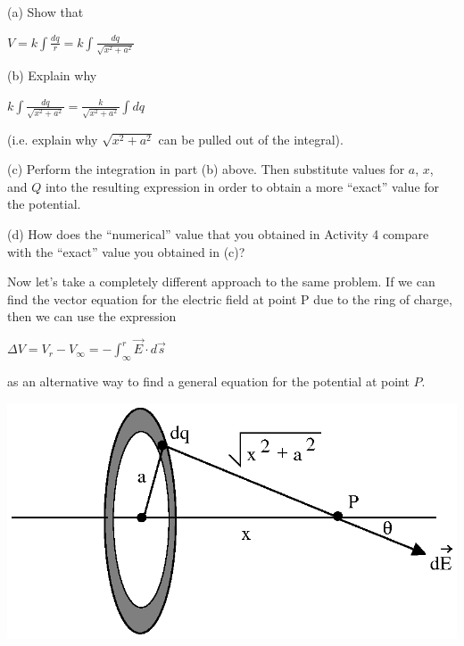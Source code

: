 (a) Show that

{\centering \( V=k\int \frac{dq}{r}=k\int \frac{dq}{\sqrt{x^{2}+a^{2}}} \)\par}
\vspace{25mm}

(b) Explain why

{\centering \( k\int \frac{dq}{\sqrt{x^{2}+a^{2}}}=\frac{k}{\sqrt{x^{2}+a^{2}}}\int dq \)\par}

(i.e. explain why \( \sqrt{x^{2}+a^{2}} \) can be pulled out of the integral).
\vspace{20mm}

(c) Perform the integration in part (b) above. Then substitute values
for $a$, $x$, and $Q$ into the resulting expression in order to obtain a
more {}``exact'' value for the potential.
\vspace{25mm}

(d) How does the {}``numerical'' value that you obtained in Activity
4 compare with the {}``exact'' value you obtained in (c)?
\vspace{20mm}

Now let's take a completely different approach to the same problem.
If we can find the vector equation for the electric field at point
P due to the ring of charge, then we can use the expression

{\centering \( \Delta V=V_{r}-V_{\infty }=-\int ^{r}_{\infty }\overrightarrow{E}\cdot d\overrightarrow{s} \)\par}

as an alternative way to find a general equation for the potential
at point $P$.

\vspace{0.3cm}
{\centering \includegraphics{electric_potential/electric_potential_fig_6.eps} \par}
\vspace{0.3cm}

